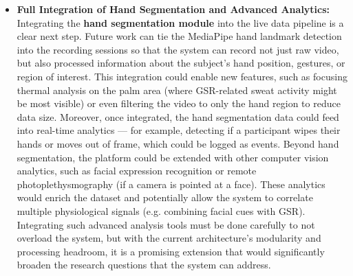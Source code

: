 \documentclass[11pt,a4paper]{report}
\begin{document}
\begin{itemize}
\item \textbf{Full Integration of Hand Segmentation and Advanced Analytics:}
  Integrating the \textbf{hand segmentation module} into the live data
  pipeline is a clear next step. Future work can tie the MediaPipe hand
  landmark detection into the recording sessions so that the system can
  record not just raw video, but also processed information about the
  subject's hand position, gestures, or region of interest. This
  integration could enable new features, such as focusing thermal
  analysis on the palm area (where GSR-related sweat activity might be
  most visible) or even filtering the video to only the hand region to
  reduce data size. Moreover, once integrated, the hand segmentation
  data could feed into real-time analytics --- for example, detecting if
  a participant wipes their hands or moves out of frame, which could be
  logged as events. Beyond hand segmentation, the platform could be
  extended with other computer vision analytics, such as facial
  expression recognition or remote photoplethysmography (if a camera is
  pointed at a face). These analytics would enrich the dataset and
  potentially allow the system to correlate multiple physiological
  signals (e.g. combining facial cues with GSR). Integrating such
  advanced analysis tools must be done carefully to not overload the
  system, but with the current architecture's modularity and processing
  headroom, it is a promising extension that would significantly broaden
  the research questions that the system can address.


\end{itemize}
\end{document}
